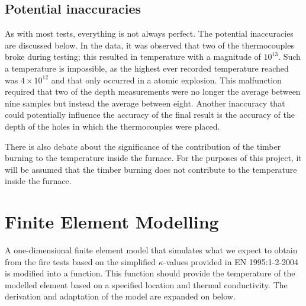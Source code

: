	\subsection{Potential inaccuracies}
	As with most tests, everything is not always perfect. 
	The potential inaccuracies are discussed below. 	
	In the data, it was observed that two of the thermocouples broke during testing; this resulted in temperature with a magnitude of $10^{13}$. 
	Such a temperature is impossible, as the highest ever recorded temperature reached was $4\times 10^{12}$ and that only occurred in a atomic explosion. %
	This malfunction required that two of the depth measurements were no longer the average between nine samples but instead the average between eight.
	Another inaccuracy that could potentially influence the accuracy of the final result is the accuracy of the depth of the holes in which the thermocouples were placed. 
	
	There is also debate about the significance of the contribution of the timber burning to the temperature inside the furnace. 
	For the purposes of this project, it will be assumed that the timber burning does not contribute to the temperature inside the furnace.
	
	
	
\section{Finite Element Modelling}\label{femexpl}
A one-dimensional finite element model that simulates what we expect to obtain from the fire tests based on the simplified $\kappa$-values provided in EN 1995:1-2-2004 \citep{Euro:2004} is modified into a function.
This function should provide the temperature of the modelled element based on a specified location and thermal conductivity.
The derivation and adaptation of the model are expanded on below.

